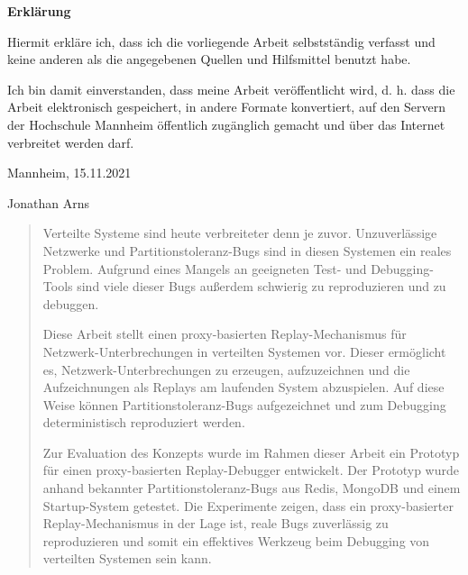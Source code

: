 \documentclass[12pt,a4paper]{report}
\begin{document}
\newpage
\thispagestyle{empty}

\begin{Large}\textbf{Erklärung}\end{Large}

Hiermit erkläre ich, dass ich die vorliegende Arbeit selbstständig verfasst und keine anderen als die angegebenen Quellen und
Hilfsmittel benutzt habe.

Ich bin damit einverstanden, dass meine Arbeit veröffentlicht wird, d. h. dass die Arbeit elektronisch gespeichert, in andere
Formate konvertiert, auf den Servern der Hochschule Mannheim öffentlich zugänglich gemacht und über das Internet verbreitet
werden darf.

\vspace{1cm}

Mannheim, 15.11.2021

\vspace{1.5cm}

Jonathan Arns

\newpage

\begin{abstract}
	Verteilte Systeme sind heute verbreiteter denn je zuvor.
	Unzuverlässige Netzwerke und Partitionstoleranz-Bugs sind in diesen Systemen ein reales Problem.
	Aufgrund eines Mangels an geeigneten Test- und Debugging-Tools sind viele dieser Bugs außerdem schwierig zu reproduzieren
	und zu debuggen.

	Diese Arbeit stellt einen proxy-basierten Replay-Mechanismus für Netzwerk-Unterbrechungen in verteilten Systemen vor.
	Dieser ermöglicht es, Netzwerk-Unterbrechungen zu erzeugen, aufzuzeichnen und die Aufzeichnungen als Replays am laufenden System
	abzuspielen. Auf diese Weise können Partitions\-toleranz-Bugs aufgezeichnet und zum Debugging deterministisch reproduziert werden.

	Zur Evaluation des Konzepts wurde im Rahmen dieser Arbeit ein Prototyp für einen proxy-basierten Replay-Debugger entwickelt.
	Der Prototyp wurde anhand bekannter Partitionstoleranz-Bugs aus Redis, MongoDB und einem Startup-System getestet.
	Die Experimente zeigen, dass ein proxy-basierter Replay-Mechanismus in der Lage ist, reale Bugs zuverlässig zu reproduzieren und somit
	ein effektives Werkzeug beim Debugging von verteilten Systemen sein kann.
\end{abstract}

\setlength{\parskip}{0em}
\tableofcontents
\thispagestyle{empty}
\setlength{\parskip}{0.6em}
\end{document}
